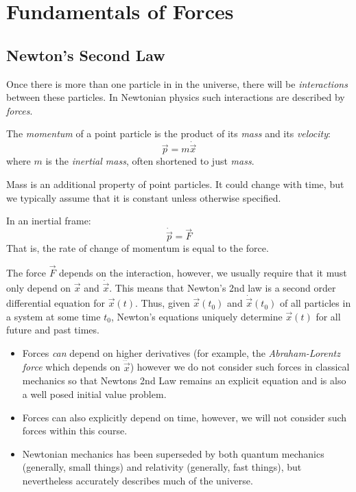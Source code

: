 \documentclass[../main.tex]{subfiles}
\begin{document}
\chapter{Fundamentals of Forces}
\section{Newton's Second Law}
Once there is more than one particle in in the universe, there will be \textit{interactions} between these particles.
In Newtonian physics such interactions are described by \textit{forces}.\quad
\begin{definition}[Momentum]
  The \textit{momentum} of a point particle is the product of its \textit{mass} and its \textit{velocity}:
  \[
    \vec{p} = m \dot{\vec{x}}
  \]
  where $m$ is the \textit{inertial mass}, often shortened to just \textit{mass}.
\end{definition}
Mass is an additional property of point particles.
It could change with time, but we typically assume that it is constant unless otherwise specified.
\begin{law}
  In an inertial frame:
  \[
    \dot{\vec{p}} = \vec{F}
  \]
  That is, the rate of change of momentum is equal to the force.
  \label{newton2}
\end{law}
The force $\vec{F}$ depends on the interaction, however, we usually require that it must only depend on $\vec{x}$ and $\dot{\vec{x}}$.
This means that Newton's 2nd law is a second order differential equation for $\vec{x}(t)$.
Thus, given $\vec{x}(t_0)$ and $\dot{\vec{x}}(t_0)$ of all particles in a system at some time $t_0$, Newton's equations uniquely determine $\vec{x}(t)$ for all future and past times.
\begin{remark}[Remarks]
  \begin{itemize}
    \item Forces \textit{can} depend on higher derivatives (for example, the \textit{Abraham-Lorentz force} which depends on $\dddot{\vec{x}}$) however we do not consider such forces in classical mechanics so that Newtons 2nd Law remains an explicit equation and is also a well posed initial value problem.
    \item Forces can also explicitly depend on time, however, we will not consider such forces within this course.
    \item Newtonian mechanics has been superseded by both quantum mechanics (generally, small things) and relativity (generally, fast things), but nevertheless accurately describes much of the universe.
  \end{itemize}
\end{remark}
\end{document}
